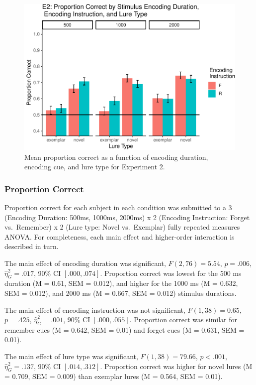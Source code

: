 \documentclass[
  man,floatsintext]{apa6}
\begin{document}
\begin{figure}
\centering
\includegraphics{honorsThesis_NEW_files/figure-latex/e2fig1-1.pdf}
\caption{\label{fig:e2fig1}Mean proportion correct as a function of encoding duration, encoding cue, and lure type for Experiment 2.}
\end{figure}

\hypertarget{proportion-correct-1}{%
\subsubsection{Proportion Correct}\label{proportion-correct-1}}

Proportion correct for each subject in each condition was submitted to a 3 (Encoding Duration: 500ms, 1000ms, 2000ms) x 2 (Encoding Instruction: Forget vs.~Remember) x 2 (Lure type: Novel vs.~Exemplar) fully repeated measures ANOVA. For completeness, each main effect and higher-order interaction is described in turn.

The main effect of encoding duration was significant, \(F(2, 76) = 5.54\), \(p = .006\), \(\hat{\eta}^2_G = .017\), 90\% CI \([.000, .074]\). Proportion correct was lowest for the 500 ms duration (M = 0.61, SEM = 0.012), and higher for the 1000 ms (M = 0.632, SEM = 0.012), and 2000 ms (M = 0.667, SEM = 0.012) stimulus durations.

The main effect of encoding instruction was not significant, \(F(1, 38) = 0.65\), \(p = .425\), \(\hat{\eta}^2_G = .001\), 90\% CI \([.000, .055]\). Proportion correct was similar for remember cues (M = 0.642, SEM = 0.01) and forget cues (M = 0.631, SEM = 0.01).

The main effect of lure type was significant, \(F(1, 38) = 79.66\), \(p < .001\), \(\hat{\eta}^2_G = .137\), 90\% CI \([.014, .312]\). Proportion correct was higher for novel lures (M = 0.709, SEM = 0.009) than exemplar lures (M = 0.564, SEM = 0.01).
\end{document}

